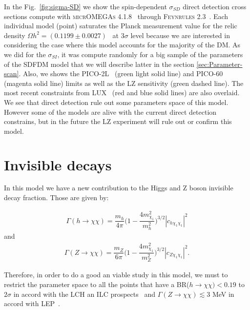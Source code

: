 In the Fig.~\ref{fig:sigma-SD} we show the spin-dependent $\sigma_{SD}$  direct detection cross sections compute with \textsc{micrOMEGAs 4.1.8}~\cite{Belanger:2014vza} through \textsc{Feynrules 2.3}~\cite{Christensen:2008py}. Each individual model (point) saturates the Planck measurement value for the relic density $\Omega h^2=(0.1199\pm0.0027)$~\cite{Ade:2013zuv} at $3\sigma$ level because we are interested in considering the case where this model accounts for the majority of the DM. As we did for the $\sigma_{SI}$, it was compute randomly for a big sample of the parameters of the SDFDM model that we will describe latter in the section \ref{sec:Parameter-scan}. 
Also, we shows the PICO-2L~\cite{Amole:2016pye} (green light solid line) and PICO-60~\cite{Amole:2015pla} (magenta solid line) limits as well as the LZ sensitivity (green dashed line). The most recent constraints from LUX~\cite{Akerib:2016lao} (red and blue solid lines) are also overlaid. 
We see that direct detection rule out some parameters space of this model. However some of the models are alive with the current direct detection constrains, but in the future the LZ experiment will rule out or confirm this model.



\section{Invisible decays}
In this model we have a new contribution to the Higgs and Z boson invisible decay fraction. Those are given by:

\begin{align}
\Gamma(h \rightarrow \chi\chi) = \dfrac{m_h}{4\pi}\bigg(1-\dfrac{4m_{\chi_1}^2}{m_h^2}\bigg)^{3/2}|c_{h\chi_1\chi_1}|^2
\end{align}
and
\begin{align}
\Gamma(Z \rightarrow \chi\chi) = \dfrac{m_Z}{6\pi}\bigg(1-\dfrac{4m_{\chi_1}^2}{m_Z^2}\bigg)^{3/2}|c_{Z\chi_1\chi_1}|^2 .
\end{align}

Therefore, in order to do a good an viable study in this model, we must to restrict the parameter space to all the points that have a BR($h\rightarrow\chi\chi) < 0.19$ to $2\sigma$ in accord with the LCH an ILC prospects~\cite{Bechtle:2014ewa} and $\Gamma(Z\rightarrow\chi\chi) \lesssim 3$ MeV in accord with LEP~\cite{ALEPH:2005ab}.





